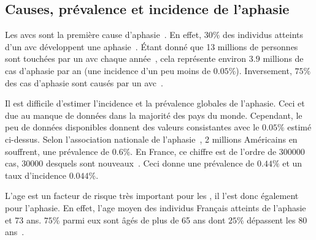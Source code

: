 \subsection{Causes, prévalence et incidence de l'aphasie}

Les \glspl{avc} sont la première cause d'aphasie~\cite{Hallowell_2017}.
En effet, \(30\%\) des individus atteints d'un \gls{avc} 
développent une aphasie~\cite{Flowers_Skoretz_Silver_Rochon_Fang_Flamand-Roze_Martino_2016}.
Étant donné que 13 millions de personnes sont touchées par un \gls{avc} 
chaque année~\cite{Smaili_Langlois_Pribil_2022},
cela représente environ \(3.9\) millions de cas d'aphasie par an (une incidence d'un peu moins de \(0.05\%\)).
Inversement, \(75\%\) des cas d'aphasie sont causés par un \gls{avc}~\cite{CNSA_2015}.

Il est difficile d'estimer l'incidence et la prévalence globales de l'aphasie.
Ceci et due au manque de données dans la majorité des pays du monde.
Cependant, le peu de données disponibles donnent des valeurs consistantes avec le \(0.05\%\) estimé ci-dessus.
Selon l'association nationale de l'aphasie~\cite{Home}, 2 millions Américains en souffrent, 
une prévalence de \(0.6\%\).
En France, ce chiffre est de l'ordre de 300000 cas, 30000 desquels sont nouveaux~\cite{CNSA_2015}.
Ceci donne une prévalence de \(0.44\%\) et un taux d'incidence \(0.044\%\).

L'age est un facteur de risque très important pour les ,
il l'est donc également pour l'aphasie. 
En effet, l'age moyen des individus Français atteints de l'aphasie et 73 ans.
\(75\%\) parmi eux sont âgés de plus de 65 ans dont \(25\%\) dépassent les 80 ans~\cite{CNSA_2015}.






